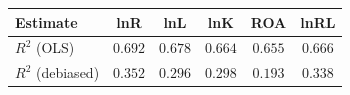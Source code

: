 \begin{tabular}{l*{5}{c}}
\hline\hline
 Estimate & lnR & lnL & lnK & ROA & lnRL \\
\hline
\addlinespace $ R^2$ (OLS) & $0.692$ & $0.678$ & $0.664$ & $0.655$ & $0.666$ \\
$ R^2$ (debiased) & $0.352$ & $0.296$ & $0.298$ & $0.193$ & $0.338$ \\
\hline\hline
\end{tabular}
